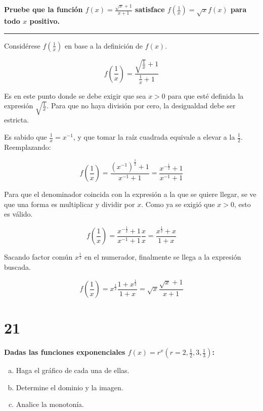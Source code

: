 \documentclass{article}
\newcommand{\sectionx}[1]{\section*{#1}\label{sec:#1}\addcontentsline{toc}{section}{\nameref{sec:#1}}}
\begin{document}
\textbf{Pruebe que la función $ f(x) = \frac{\sqrt{x} + 1}{x + 1} $ satisface $ f\left( \frac{1}{x} \right) =   \sqrt{x} f(x) $ para todo $x$ positivo.}

\vspace{1em}
\hrule
\vspace{1em}

Considérese $ f\left( \frac{1}{x} \right) $ en base a la definición de $ f(x) $.

\begin{equation}
f\left( \frac{1}{x} \right) = \frac{\sqrt{ \frac{1}{x} } + 1}{\frac{1}{x} + 1}
\end{equation}

Es en este punto donde se debe exigir que sea $x > 0$ para que esté definida la expresión $\sqrt{\frac{1}{x}}$. Para que no haya división por cero, la desigualdad debe ser estricta.

Es sabido que $ \frac{1}{x} = x^{-1} $, y que tomar la raíz cuadrada equivale a elevar a la $\frac{1}{2}$. Reemplazando:

\begin{equation}
f\left( \frac{1}{x} \right) = \frac{ (x^{-1})^{\frac{1}{2}} + 1}{x^{-1} + 1} = \frac{x^{-\frac{1}{2}} + 1}{x^{-1} + 1}
\end{equation}

Para que el denominador coincida con la expresión a la que se quiere llegar, se ve que una forma es multiplicar y dividir por $x$. Como ya se exigió que $x > 0$, esto es válido.

\begin{equation}
f\left( \frac{1}{x} \right) = \frac{x^{-\frac{1}{2}} + 1}{x^{-1} + 1} \frac{x}{x} = \frac{x^{\frac{1}{2}} + x}{1+x}
\end{equation}

Sacando factor común $x^{\frac{1}{2}}$ en el numerador, finalmente se llega a la expresión buscada.

\begin{equation}
f\left( \frac{1}{x} \right) = x^{\frac{1}{2}} \frac{1 + x^{\frac{1}{2}}}{1 + x} = \sqrt{x} \frac{\sqrt{x} + 1}{x + 1}
\end{equation}

\sectionx{21}

\textbf{Dadas las funciones exponenciales $ f(x) = r^x \left( r = 2, \frac{1}{2}, 3, \frac{1}{3} \right) $:}

\begin{enumerate}[(a)]

\bfseries

\item Haga el gráfico de cada una de ellas.

\item Determine el dominio y la imagen.

\item Analice la monotonía.

\end{enumerate}
\end{document}
